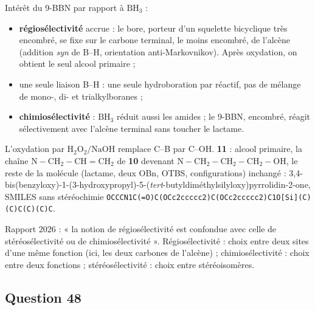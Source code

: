 \documentclass[11pt,a4paper]{article}
\providecommand{\tightlist}{\setlength{\itemsep}{0pt}\setlength{\parskip}{0pt}}
\begin{document}
Intérêt du 9-BBN par rapport à \(\mathrm{BH_3}\) :

\begin{itemize}
\tightlist
\item
  \textbf{régiosélectivité} accrue : le bore, porteur d'un squelette bicyclique très encombré, se fixe sur le carbone terminal, le moins encombré, de l'alcène (addition \emph{syn} de B--H, orientation anti-Markovnikov). Après oxydation, on obtient le seul alcool primaire ;
\item
  une seule liaison B--H : une seule hydroboration par réactif, pas de mélange de mono-, di- et trialkylboranes ;
\item
  \textbf{chimiosélectivité} : \(\mathrm{BH_3}\) réduit aussi les amides ; le 9-BBN, encombré, réagit sélectivement avec l'alcène terminal sans toucher le lactame.
\end{itemize}

L'oxydation par \(\mathrm{H_2O_2}/\mathrm{NaOH}\) remplace C--B par C--OH. \textbf{11} : alcool primaire, la chaîne \(\mathrm{N{-}CH_2{-}CH{=}CH_2}\) de \textbf{10} devenant \(\mathrm{N{-}CH_2{-}CH_2{-}CH_2{-}OH}\), le reste de la molécule (lactame, deux OBn, OTBS, configurations) inchangé : 3,4-\allowbreak{}bis(benzyloxy)-\allowbreak{}1-\allowbreak{}(3-\allowbreak{}hydroxypropyl)-\allowbreak{}5-\allowbreak{}(\emph{tert}-\allowbreak{}butyldiméthylsilyloxy)pyrrolidin-\allowbreak{}2-\allowbreak{}one, SMILES sans stéréochimie \texttt{OCCCN1C(\allowbreak{}=\allowbreak{}O)\allowbreak{}C(\allowbreak{}OCc2ccccc2)\allowbreak{}C(\allowbreak{}OCc2ccccc2)\allowbreak{}C1O{[}Si{]}\allowbreak{}(\allowbreak{}C)\allowbreak{}(\allowbreak{}C)\allowbreak{}C(\allowbreak{}C)\allowbreak{}(\allowbreak{}C)\allowbreak{}C}.

\begin{piege}

Rapport 2026 : « la notion de régiosélectivité est confondue avec celle de stéréosélectivité ou de chimiosélectivité ». Régiosélectivité : choix entre deux sites d'une même fonction (ici, les deux carbones de l'alcène) ; chimiosélectivité : choix entre deux fonctions ; stéréosélectivité : choix entre stéréoisomères.

\end{piege}

\hypertarget{question-48}{%
\subsection{Question 48}\label{question-48}}
\end{document}
